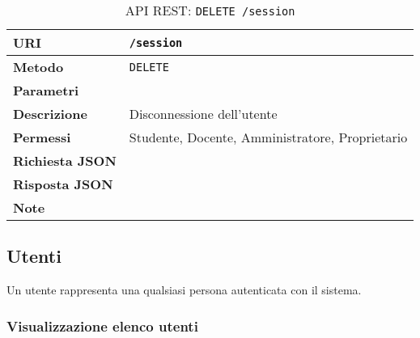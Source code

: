         \begin{table}[H]
            \begin{center}
                \begin{tabular}{p{} p{}}
                    \toprule
                    \textbf{URI} & \texttt{/session} \\ \midrule
                    \textbf{Metodo} & \texttt{DELETE} \\ \midrule
                    \textbf{Parametri} & \\ \midrule
                    \textbf{Descrizione} & Disconnessione dell'utente \\ \midrule
                    \textbf{Permessi} & Studente, Docente, Amministratore, Proprietario  \\ \midrule
                    \textbf{Richiesta JSON} & \\ \midrule
                    \textbf{Risposta JSON} & \\ \midrule
                    \textbf{Note} & \\
                    \bottomrule
                \end{tabular}
                \caption{API REST: \texttt{DELETE /session}}
            \end{center}
        \end{table}

\subsection{Utenti}

    Un utente rappresenta una qualsiasi persona autenticata con il sistema.

    \subsubsection{Visualizzazione elenco utenti}

